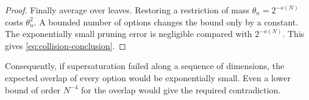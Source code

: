 \begin{proof}
Finally average over leaves. Restoring a restriction of mass
\(\theta_n=2^{-o(N)}\) costs \(\theta_n^2\). A bounded number of
options changes the bound only by a constant. The exponentially small
pruning error is negligible compared with \(2^{-o(N)}\). This gives
\eqref{eq:collision-conclusion}.
\end{proof}

Consequently, if supersaturation failed along a sequence of dimensions,
the expected overlap of every option would be exponentially small.
Even a lower bound of order \(N^{-4}\) for the overlap would give the
required contradiction.
